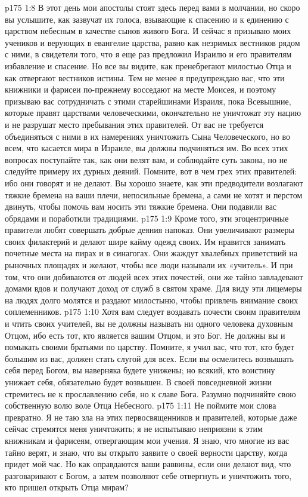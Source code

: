 \vs p175 1:8 В этот день мои апостолы стоят здесь перед вами в молчании, но скоро вы услышите, как зазвучат их голоса, взывающие к спасению и к единению с царством небесным в качестве сынов живого Бога. И сейчас я призываю моих учеников и верующих в евангелие царства, равно как незримых вестников рядом с ними, в свидетели того, что я еще раз предложил Израилю и его правителям избавление и спасение. Но все вы видите, как пренебрегают милостью Отца и как отвергают вестников истины. Тем не менее я предупреждаю вас, что эти книжники и фарисеи по\hyp{}прежнему восседают на месте Моисея, и поэтому призываю вас сотрудничать с этими старейшинами Израиля, пока Всевышние, которые правят царствами человеческими, окончательно не уничтожат эту нацию и не разрушат место пребывания этих правителей. От вас не требуется объединяться с ними в их намерениях уничтожить Сына Человеческого, но во всем, что касается мира в Израиле, вы должны подчиняться им. Во всех этих вопросах поступайте так, как они велят вам, и соблюдайте суть закона, но не следуйте примеру их дурных деяний. Помните, вот в чем грех этих правителей: ибо они говорят и не делают. Вы хорошо знаете, как эти предводители возлагают тяжкие бремена на ваши плечи, непосильные бремена, а сами не хотят и перстом двинуть, чтобы помочь вам носить эти тяжкие бремена. Они подавили вас обрядами и поработили традициями.
\vs p175 1:9 Кроме того, эти эгоцентричные правители любят совершать добрые деяния напоказ. Они увеличивают размеры своих филактерий и делают шире кайму одежд своих. Им нравится занимать почетные места на пирах и в синагогах. Они жаждут хвалебных приветствий на рыночных площадях и желают, чтобы все люди называли их «учитель». И при том, что они добиваются от людей всех этих почестей, они же тайно завладевают домами вдов и получают доход от служб в святом храме. Для виду эти лицемеры на людях долго молятся и раздают милостыню, чтобы привлечь внимание своих соплеменников.
\vs p175 1:10 Хотя вам следует воздавать почести своим правителям и чтить своих учителей, вы не должны называть ни одного человека духовным Отцом, ибо есть тот, кто является вашим Отцом, и это Бог. Не должны вы и помыкать своими братьями по царству. Помните, я учил вас, что тот, кто будет большим из вас, должен стать слугой для всех. Если вы осмелитесь возвышать себя перед Богом, вы наверняка будете унижены; но всякий, кто воистину унижает себя, обязательно будет возвышен. В своей повседневной жизни стремитесь не к прославлению себя, но к славе Бога. Разумно подчиняйте свою собственную волю воле Отца Небесного.
\vs p175 1:11 Не поймите мои слова превратно. Я не таю зла на этих первосвященников и правителей, которые даже сейчас стремятся меня уничтожить; я не испытываю неприязни к этим книжникам и фарисеям, отвергающим мои учения. Я знаю, что многие из вас тайно верят, и знаю, что вы открыто заявите о своей верности царству, когда придет мой час. Но как оправдаются ваши раввины, если они делают вид, что разговаривают с Богом, а затем позволяют себе отвергнуть и уничтожить того, кто пришел открыть Отца мирам?
